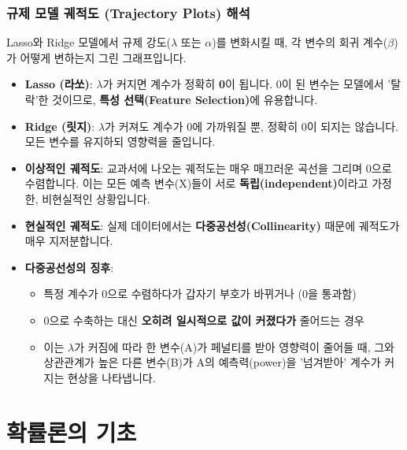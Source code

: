 \documentclass[11pt,a4paper]{book}
\theoremstyle{definition}
\begin{document}
\section{규제 모델 궤적도 (Trajectory Plots) 해석}

Lasso와 Ridge 모델에서 규제 강도($\lambda$ 또는 $\alpha$)를 변화시킬 때, 각 변수의 회귀 계수($\beta$)가 어떻게 변하는지 그린 그래프입니다.

\begin{tcolorbox}[colback=yellow!5!white, colframe=yellow!75!black, title={Lasso vs. Ridge 궤적도}]
\begin{itemize}
    \item \textbf{Lasso (라쏘)}: $\lambda$가 커지면 계수가 정확히 \textbf{0}이 됩니다. 0이 된 변수는 모델에서 '탈락'한 것이므로, \textbf{특성 선택(Feature Selection)}에 유용합니다.
    \item \textbf{Ridge (릿지)}: $\lambda$가 커져도 계수가 0에 가까워질 뿐, 정확히 0이 되지는 않습니다. 모든 변수를 유지하되 영향력을 줄입니다.
\end{itemize}
\end{tcolorbox}

\begin{itemize}
    \item \textbf{이상적인 궤적도}: 교과서에 나오는 궤적도는 매우 매끄러운 곡선을 그리며 0으로 수렴합니다. 이는 모든 예측 변수(X)들이 서로 \textbf{독립(independent)}이라고 가정한, 비현실적인 상황입니다.
    \item \textbf{현실적인 궤적도}: 실제 데이터에서는 \textbf{다중공선성(Collinearity)} 때문에 궤적도가 매우 지저분합니다.
    \item \textbf{다중공선성의 징후}:
        \begin{itemize}
            \item 특정 계수가 0으로 수렴하다가 갑자기 부호가 바뀌거나 (0을 통과함)
            \item 0으로 수축하는 대신 \textbf{오히려 일시적으로 값이 커졌다가} 줄어드는 경우
            \item 이는 $\lambda$가 커짐에 따라 한 변수(A)가 페널티를 받아 영향력이 줄어들 때, 그와 상관관계가 높은 다른 변수(B)가 A의 예측력(power)을 '넘겨받아' 계수가 커지는 현상을 나타냅니다.
        \end{itemize}
\end{itemize}


\part{확률론의 기초}
\label{part:probability}
\end{document}

